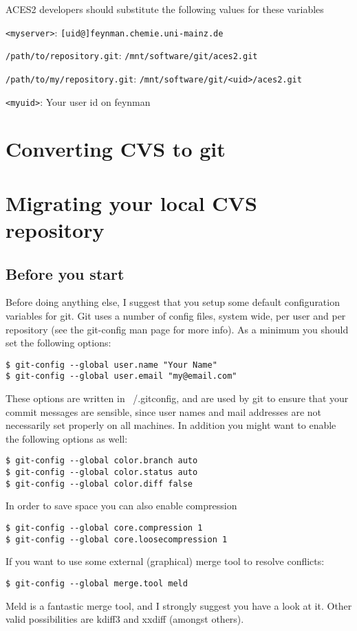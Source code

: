 \documentclass[a4paper,10pt]{article}
\begin{document}
ACES2 developers should substitute the following values for these variables
\begin{description}
  \item{\tt <myserver>}: {\tt [uid@]feynman.chemie.uni-mainz.de}
  \item{\tt /path/to/repository.git}: {\tt /mnt/software/git/aces2.git}
  \item{\tt /path/to/my/repository.git}: {\tt /mnt/software/git/<uid>/aces2.git}
  \item{\tt <myuid>}: Your user id on feynman
\end{description}

\section{Converting CVS to git}


\section{Migrating your local CVS repository}
\subsection{Before you start}
Before doing anything else, I suggest that you setup some default
configuration variables for git. Git uses a number of config files, system
wide, per user and per repository (see the git-config man page for more info).
As a minimum you should set the following options:
\begin{verbatim}
$ git-config --global user.name "Your Name"
$ git-config --global user.email "my@email.com"
\end{verbatim}
These options are written in ~/.gitconfig, and are used by git to ensure that
your commit messages are sensible, since user names and mail addresses are not
necessarily set properly on all machines. In addition you might want to enable
the following options as well:
\begin{verbatim}
$ git-config --global color.branch auto
$ git-config --global color.status auto
$ git-config --global color.diff false
\end{verbatim}
In order to save space you can also enable compression
\begin{verbatim}
$ git-config --global core.compression 1
$ git-config --global core.loosecompression 1
\end{verbatim}
If you want to use some external (graphical) merge tool to resolve conflicts:
\begin{verbatim}
$ git-config --global merge.tool meld
\end{verbatim}
Meld is a fantastic merge tool, and I strongly suggest you have a look at it.
Other valid possibilities are kdiff3 and xxdiff (amongst others).
\end{document}
